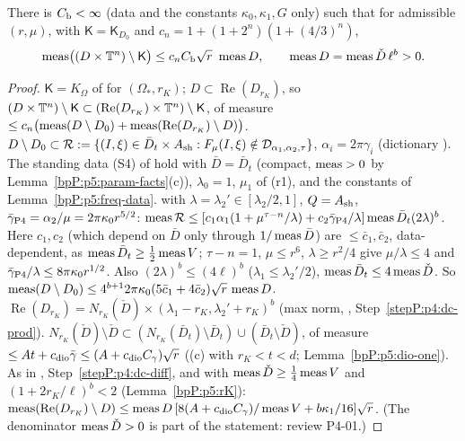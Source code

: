 \begin{lemma}\label{bpP:p5:budget}
There is $C_{\rm b}<\infty$ (data and the constants $\kappa_0,\kappa_1,G$ only) such that for admissible $(r,\mu)$, with $\mathsf K=\mathsf K_{D_0}$ and $c_n=1+(1+2^n)(1+(4/3)^n)$,
\[\operatorname{meas}\bigl((D\times\mathbb{T}^n)\setminus\mathsf K\bigr)\le c_nC_{\rm b}\sqrt r\ \operatorname{meas} D,\qquad\operatorname{meas} D=\operatorname{meas}\check D\,\ell^b>0.\]
\end{lemma}
\begin{proof}
\label{stepP:p5:bu-read} $\mathsf K=K_\Omega$ of  for $(\Omega_*,r_K)$; $D\subset\operatorname{Re}(D_{r_K})$, so $(D\times\mathbb{T}^n)\setminus\mathsf K\subset(\operatorname{Re}(D_{r_K})\times\mathbb{T}^n)\setminus\mathsf K$, of measure $\le c_n\bigl(\operatorname{meas}(D\setminus D_0)+\operatorname{meas}(\operatorname{Re}(D_{r_K})\setminus D)\bigr)$.
\label{stepP:p5:bu-dio} $D\setminus D_0\subset\mathcal R:=\{(I,\xi)\in\bar D_t\times A_{\rm sh}:F_\mu(I,\xi)\notin\mathcal D_{\alpha_1,\alpha_2,\tau}\}$, $\alpha_i=2\pi\gamma_i$ (dictionary ). The standing data (S4) of  hold with $\bar D=\bar D_t$ (compact, $\operatorname{meas}>0$ by Lemma~\ref{bpP:p5:param-facts}(c)), $\lambda_0=1$, $\mu_1$ of (r1), and the constants of Lemma~\ref{bpP:p5:freq-data}.  with $\lambda=\lambda_2'\in[\lambda_2/2,1]$, $Q=A_{\rm sh}$, $\bar\gamma_{\rm P4}=\alpha_2/\mu=2\pi\kappa_0r^{5/2}$: $\operatorname{meas}\mathcal R\le[c_1\alpha_1(1+\mu^{\tau-n}/\lambda)+c_2\bar\gamma_{\rm P4}/\lambda]\operatorname{meas}\bar D_t(2\lambda)^b$. Here $c_1,c_2$ (which depend on $\bar D$ only through $1/\operatorname{meas}\bar D$) are $\le\bar c_1,\bar c_2$, data-dependent, as $\operatorname{meas}\bar D_t\ge\frac12\operatorname{meas} V$; $\tau-n=1$, $\mu\le r^6$, $\lambda\ge r^2/4$ give $\mu/\lambda\le4$ and $\bar\gamma_{\rm P4}/\lambda\le8\pi\kappa_0r^{1/2}$. Also $(2\lambda)^b\le(4\ell)^b$ ($\lambda_1\le\lambda_2'/2$), $\operatorname{meas}\bar D_t\le4\operatorname{meas}\check D$. So $\operatorname{meas}(D\setminus D_0)\le4^{b+1}2\pi\kappa_0(5\bar c_1+4\bar c_2)\sqrt r\,\operatorname{meas} D$.
\label{stepP:p5:bu-collar} $\operatorname{Re}(D_{r_K})=N_{r_K}(\check D)\times(\lambda_1-r_K,\lambda_2'+r_K)^b$ (max norm, , Step~\ref{stepP:p4:dc-prod}). $N_{r_K}(\check D)\setminus\check D\subset(N_{r_K}(\bar D_t)\setminus\bar D_t)\cup(\bar D_t\setminus\check D)$, of measure $\le At+c_{\rm dio}\bar\gamma\le(A+c_{\rm dio}C_\gamma)\sqrt r$ ((c) with $r_K<t<d$; Lemma~\ref{bpP:p5:dio-one}). As in , Step~\ref{stepP:p4:dc-diff}, and with $\operatorname{meas}\check D\ge\frac14\operatorname{meas} V$ and $(1+2r_K/\ell)^b<2$ (Lemma~\ref{bpP:p5:rK}): $\operatorname{meas}(\operatorname{Re}(D_{r_K})\setminus D)\le\operatorname{meas} D\,[8(A+c_{\rm dio}C_\gamma)/\operatorname{meas} V+b\kappa_1/16]\sqrt r$. (The denominator $\operatorname{meas}\check D>0$ is part of the statement: review P4-01.)
\end{proof}

